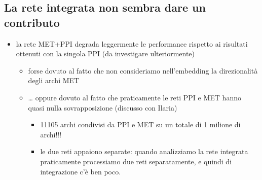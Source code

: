 \documentclass[
]{article}
\providecommand{\tightlist}{%
  \setlength{\itemsep}{0pt}\setlength{\parskip}{0pt}}
\begin{document}
\hypertarget{la-rete-integrata-non-sembra-dare-un-contributo}{%
\subsection{La rete integrata non sembra dare un
contributo}\label{la-rete-integrata-non-sembra-dare-un-contributo}}

\begin{itemize}
\tightlist
\item
  la rete MET+PPI degrada leggermente le performance rispetto ai
  risultati ottenuti con la singola PPI (da investigare ulteriormente)

  \begin{itemize}
  \tightlist
  \item
    forse dovuto al fatto che non consideriamo nell'embedding la
    direzionalità degli archi MET
  \item
    \ldots{} oppure dovuto al fatto che praticamente le reti PPI e MET
    hanno quasi nulla sovrapposizione (discusso con Ilaria)

    \begin{itemize}
    \tightlist
    \item
      11105 archi condivisi da PPI e MET su un totale di 1 milione di
      archi!!!
    \item
      le due reti appaiono separate: quando analizziamo la rete
      integrata praticamente processiamo due reti separatamente, e
      quindi di integrazione c'è ben poco.
    \end{itemize}
  \end{itemize}
\end{itemize}
\end{document}
